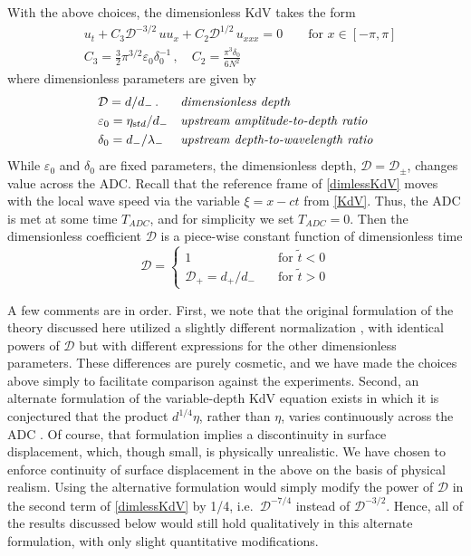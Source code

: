 \documentclass[11pt]{article}
\newcommand{\eps}{\varepsilon}
\newcommand{\etastd}{\eta_{\text std}}
\newcommand{\depth}{d}
\newcommand{\dup}{\depth_{-}}
\newcommand{\ddn}{\depth_{+}}
\newcommand{\lam}{\lambda}
\newcommand{\lamup}{\lam_{-}}
\newcommand{\lamfac}{N}
\newcommand{\drat}{\mathcal{D}}
\newcommand{\dratdn}{\drat_+}
\newcommand{\dratupdn}{\drat_{\pm}}
\newcommand{\epsup}{\eps_0}
\newcommand{\delup}{\delta_0}
\begin{document}
With the above choices, the dimensionless KdV takes the form
\begin{align}
\label{dimlessKdV}
&u_t + C_3 \drat^{-3/2} \, u u_x + C_2 \drat^{1/2} \, u_{xxx} = 0
\qquad \text{for } x \in [-\pi,\pi] \\
&C_3 = \frac{3}{2} \pi^{3/2} \epsup \delup^{-1} \, , \quad
C_2 = \frac{\pi^3 \delup}{6 \lamfac^2} 
\end{align}
where dimensionless parameters are given by
\begin{align}
&\drat = {\depth}/{\dup} \, .
&&\mbox{\em dimensionless depth} \\
&\epsup = \etastd / \dup
&&\mbox{\em upstream amplitude-to-depth ratio} \\
&\delup = \dup / \lamup
&&\mbox{\em upstream depth-to-wavelength ratio}
\end{align}
While $\epsup$ and $\delup$ are fixed parameters, the dimensionless depth, $\drat = \dratupdn$, changes value across the ADC. Recall that the reference frame of \eqref{dimlessKdV} moves with the local wave speed via the variable $\xi = x-ct$ from \eqref{KdV}. Thus, the ADC is met at some time $T_{ADC}$, and for simplicity we set $T_{ADC} = 0$. Then the dimensionless coefficient $\drat$ is a piece-wise constant function of dimensionless time
\begin{equation}
\drat = 
\begin{cases}
1 		&\quad \mbox{for } \tilde{t}<0 \\
\dratdn = {\ddn}/{\dup} 	&\quad \mbox{for } \tilde{t}>0
\end{cases}
\end{equation}

A few comments are in order. First, we note that the original formulation of the theory discussed here utilized a slightly different normalization \cite{majda2019statistical}, with identical powers of $\drat$ but with different expressions for the other dimensionless parameters. These differences are purely cosmetic, and we have made the choices above simply to facilitate comparison against the experiments. Second, an alternate formulation of the variable-depth KdV equation exists in which it is conjectured that the product $\depth^{1/4} \eta$, rather than $\eta$, varies continuously across the ADC \cite{johnson1997modern}. Of course, that formulation implies a discontinuity in surface displacement, which, though small, is physically unrealistic. We have chosen to enforce continuity of surface displacement in the above on the basis of physical realism. Using the alternative formulation would simply modify the power of $\drat$ in the second term of \eqref{dimlessKdV} by 1/4, i.e.~$\drat^{-7/4}$ instead of $\drat^{-3/2}$. Hence, all of the results discussed below would still hold qualitatively in this alternate formulation, with only slight quantitative modifications.
\end{document}
